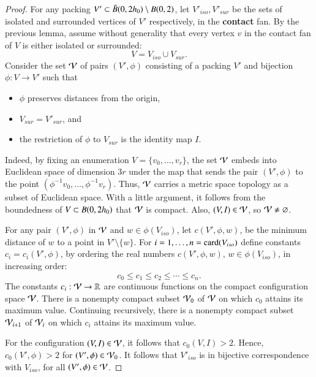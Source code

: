 \begin{proof}  For any packing $V'\subset \bar B(0,2{h_0})\setminus B(0,2)$, let $V'_{iso},V'_{sur}$ be the
sets of isolated and surrounded vertices of $V'$ respectively, in the {\bf contact}
fan.  
By the previous lemma,  assume
without generality that every vertex $v$ in the contact fan of $V$ is either isolated
or surrounded:
$$
V = V_{iso} \cup V_{sur}.
$$
Consider the set ${\mathcal V}$ of pairs $(V',\phi)$ consisting of a packing $V'$
and bijection $\phi:V\to V'$ such that
\begin{itemize}
\item $\phi$ preserves distances from the origin, 
\item $V_{sur}=V'_{sur}$, and 
\item the restriction of $\phi$ to $V_{sur}$ is the identity map $I$.
\end{itemize}
%

  Indeed, by fixing an enumeration
$V = \{v_0,\ldots,v_r\}$,  
the set ${\mathcal V}$ embeds into Euclidean space of dimension $3r$ under the map that sends
the pair $(V',\phi)$ to 
the point $(\phi^{-1}v_0,\ldots,\phi^{-1}v_r)$.
Thus, ${\mathcal V}$ carries a metric space topology as a subset of Euclidean space.  With a little
argument, it follows from the boundedness of $V\subset B(0,2{h_0})$ that ${\mathcal V}$ is compact.
Also, $(V,I)\in {\mathcal V}$, so ${\mathcal V}\ne\varnothing$.


For any pair $(V',\phi)$ in ${\mathcal V}$ and $w\in \phi(V_{iso})$, let
$c(V',\phi,w)$, 
be the minimum distance of $w$ to a point
in $V'\setminus \{w\}$.   
For $i=1,\ldots,n={\operatorname{card}}(V_{iso})$
define constants $c_i=c_i(V',\phi)$,
by ordering the real numbers $c(V',\phi,w)$, $w\in\phi(V_{iso})$, in increasing order:
$$
c_0 \le c_1 \le c_2 \le \cdots \le c_n.
$$
The constants $c_i:{\mathcal V}\to\mathbb{R}$ are continuous functions on the compact configuration space ${\mathcal V}$.
There is a nonempty 
compact subset ${\mathcal V}_0$ of ${\mathcal V}$ on which
$c_0$ attains its maximum value. Continuing recursively,
there is a nonempty compact subset ${\mathcal V}_{i+1}$ of
${\mathcal V}_{i}$ on which $c_i$ attains its maximum value.
%
%

For the configuration $(V,I)\in {\mathcal V}$, it follows that $c_0(V,I) >2$.
Hence, $c_0(V',\phi)>2$ for $(V',\phi)\in{\mathcal V}_0$.  It follows
that $V'_{iso}$ is in bijective correspondence with
$V_{iso}$, for all $(V',\phi)\in {\mathcal V}$.


\end{proof}
